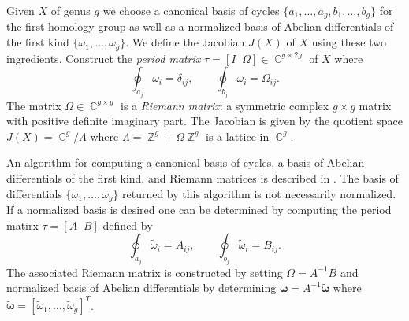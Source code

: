 \documentclass[12pt]{article}
\theoremstyle{definition}
\DeclareMathOperator{\ZZ}{\mathbb{Z}}
\DeclareMathOperator{\CC}{\mathbb{C}}
\begin{document}
Given $X$ of genus $g$ we choose a canonical basis of cycles
$\{a_1,\ldots,a_g,b_1,\ldots,b_g\}$ for the first homology group as well
as a normalized basis of Abelian differentials of the first kind
$\{\omega_1, \ldots, \omega_g\}$. We define the Jacobian $J(X)$ of $X$
using these two ingredients. Construct the {\it period matrix} $\tau =
[I \; \; \Omega] \in \CC^{g \times 2g}$ of $X$ where
\begin{equation} \label{eqn:periodmatrix}
  \oint_{a_j} \omega_i = \delta_{ij}, \qquad
  \oint_{b_j} \omega_i = \Omega_{ij}.
\end{equation}
The matrix $\Omega \in \CC^{g \times g}$ is a {\it Riemann matrix}: a
symmetric complex $g \times g$ matrix with positive definite imaginary
part. The Jacobian is given by the quotient space $J(X) = \CC^g /
\Lambda$ where $\Lambda = \ZZ^g + \Omega \ZZ^g$ is a lattice in
$\CC^g$.

An algorithm for computing a canonical basis of cycles, a basis of
Abelian differentials of the first kind, and Riemann matrices is
described in \cite{DeconinckPatterson08}. The basis of differentials
$\{\tilde{\omega}_1, \ldots, \tilde{\omega}_g\}$ returned by this
algorithm is not necessarily normalized. If a normalized basis is
desired one can be determined by computing the period matirx $\tau = [A
  \;\; B]$ defined by
\begin{equation} \label{eqn:periodmatrixnotnormal}
  \oint_{a_j} \tilde{\omega}_i = A_{ij}, \qquad
  \oint_{b_j} \tilde{\omega}_i = B_{ij}.
\end{equation}
The associated Riemann matrix is constructed by setting $\Omega =
A^{-1}B$ and normalized basis of Abelian differentials by determining
$\boldsymbol{\omega} = A^{-1}\tilde{\boldsymbol{\omega}}$ where
$\tilde{\boldsymbol{\omega}} = [\tilde{\omega}_1, \ldots,
  \tilde{\omega}_g]^T$.
\end{document}
